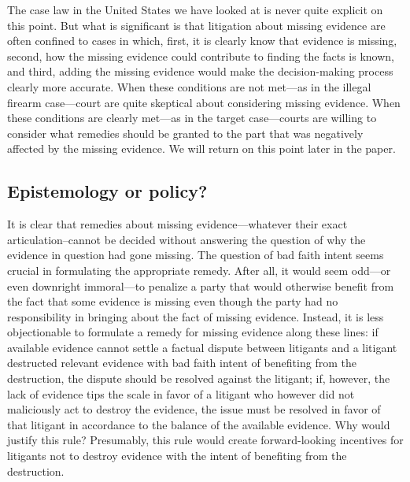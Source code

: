 \documentclass[
  10pt,
  dvipsnames,enabledeprecatedfontcommands]{scrartcl}
\begin{document}
The case law in the United States we have looked at is never quite
explicit on this point. But what is significant is that litigation about
missing evidence are often confined to cases in which, first, it is
clearly know that evidence is missing, second, how the missing evidence
could contribute to finding the facts is known, and third, adding the
missing evidence would make the decision-making process clearly more
accurate. When these conditions are not met---as in the illegal firearm
case---court are quite skeptical about considering missing evidence.
When these conditions are clearly met---as in the target case---courts
are willing to consider what remedies should be granted to the part that
was negatively affected by the missing evidence. We will return on this
point later in the paper.

\hypertarget{epistemology-or-policy}{%
\subsection{Epistemology or policy?}\label{epistemology-or-policy}}

It is clear that remedies about missing evidence---whatever their exact
articulation--cannot be decided without answering the question of why
the evidence in question had gone missing. The question of bad faith
intent seems crucial in formulating the appropriate remedy. After all,
it would seem odd---or even downright immoral---to penalize a party that
would otherwise benefit from the fact that some evidence is missing even
though the party had no responsibility in bringing about the fact of
missing evidence. Instead, it is less objectionable to formulate a
remedy for missing evidence along these lines: if available evidence
cannot settle a factual dispute between litigants and a litigant
destructed relevant evidence with bad faith intent of benefiting from
the destruction, the dispute should be resolved against the litigant;
if, however, the lack of evidence tips the scale in favor of a litigant
who however did not maliciously act to destroy the evidence, the issue
must be resolved in favor of that litigant in accordance to the balance
of the available evidence. Why would justify this rule? Presumably, this
rule would create forward-looking incentives for litigants not to
destroy evidence with the intent of benefiting from the destruction.
\end{document}
